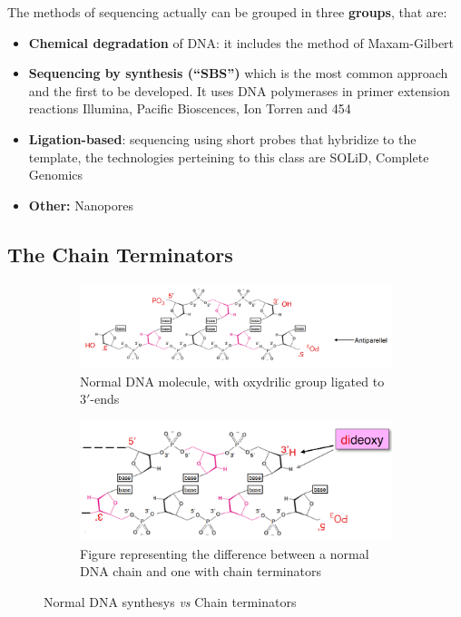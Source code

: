 The methods of sequencing actually can be grouped in three \textbf{groups}, that are: 

\begin{itemize}
	\item \textbf{Chemical degradation} of DNA: it includes the method of Maxam-Gilbert
	\item \textbf{Sequencing by synthesis (“SBS”)} which is the most common approach and the first to be developed. It uses DNA polymerases in primer extension reactions Illumina, Pacific Bioscences, Ion Torren and 454
	\item \textbf{Ligation-based}: sequencing using short probes that hybridize to the template, the technologies perteining to this class are SOLiD, Complete Genomics
	\item \textbf{Other:} Nanopores
\end{itemize}

\subsection{The Chain Terminators}

\begin{figure}[H]
    \centering
    \begin{subfigure}[b]{0.49\textwidth}
        \centering
        \includegraphics[width=\textwidth]{DNA-molecule}
        \caption{Normal DNA molecule, with oxydrilic group ligated to $3'$-ends}
        \label{normalDNAaddition}
    \end{subfigure}
    \hfill
    \begin{subfigure}[b]{0.49\textwidth}
        \centering
        \includegraphics[width=\textwidth]{chain-term}
        \caption{Figure representing the difference between a normal DNA chain and one with chain terminators}
        \label{ChainTerm}
    \end{subfigure}
    \caption{Normal DNA synthesys \textit{vs} Chain terminators}
\end{figure}


